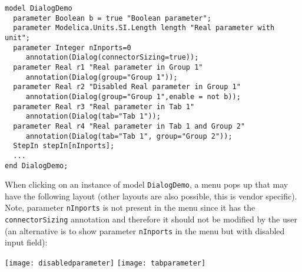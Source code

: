 \begin{example}
\begin{lstlisting}[language=modelica]
model DialogDemo
  parameter Boolean b = true "Boolean parameter";
  parameter Modelica.Units.SI.Length length "Real parameter with unit";
  parameter Integer nInports=0
     annotation(Dialog(connectorSizing=true));
  parameter Real r1 "Real parameter in Group 1"
     annotation(Dialog(group="Group 1"));
  parameter Real r2 "Disabled Real parameter in Group 1"
     annotation(Dialog(group="Group 1",enable = not b));
  parameter Real r3 "Real parameter in Tab 1"
     annotation(Dialog(tab="Tab 1"));
  parameter Real r4 "Real parameter in Tab 1 and Group 2"
     annotation(Dialog(tab="Tab 1", group="Group 2"));
  StepIn stepIn[nInports];
  ...
end DialogDemo;
\end{lstlisting}
When clicking on an instance of model \lstinline!DialogDemo!, a menu pops up
that may have the following layout (other layouts are also possible,
this is vendor specific). Note, parameter \lstinline!nInports! is not present in the
menu since it has the \lstinline!connectorSizing! annotation and therefore it
should not be modified by the user (an alternative is to show parameter
\lstinline!nInports! in the menu but with disabled input field):

\begin{center}
\texttt{[image: disabledparameter]}
\quad
\texttt{[image: tabparameter]}\\
\end{center}
\end{example}

